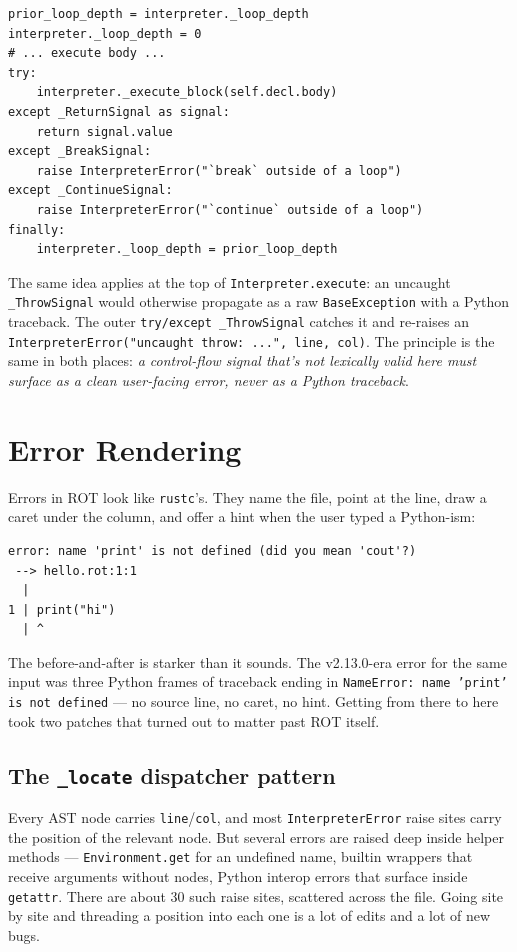 \documentclass[11pt]{article}
\begin{document}
\begin{lstlisting}[style=pystyle]
prior_loop_depth = interpreter._loop_depth
interpreter._loop_depth = 0
# ... execute body ...
try:
    interpreter._execute_block(self.decl.body)
except _ReturnSignal as signal:
    return signal.value
except _BreakSignal:
    raise InterpreterError("`break` outside of a loop")
except _ContinueSignal:
    raise InterpreterError("`continue` outside of a loop")
finally:
    interpreter._loop_depth = prior_loop_depth
\end{lstlisting}

The same idea applies at the top of \texttt{Interpreter.execute}: an uncaught \texttt{\_ThrowSignal} would otherwise propagate as a raw \texttt{BaseException} with a Python traceback. The outer \texttt{try/except \_ThrowSignal} catches it and re-raises an \texttt{InterpreterError("uncaught throw: ...", line, col)}. The principle is the same in both places: \emph{a control-flow signal that's not lexically valid here must surface as a clean user-facing error, never as a Python traceback}.

\section{Error Rendering}

Errors in ROT look like \texttt{rustc}'s. They name the file, point at the line, draw a caret under the column, and offer a hint when the user typed a Python-ism:

\begin{lstlisting}[style=plainstyle, basicstyle=\ttfamily\footnotesize]
error: name 'print' is not defined (did you mean 'cout'?)
 --> hello.rot:1:1
  |
1 | print("hi")
  | ^
\end{lstlisting}

The before-and-after is starker than it sounds. The v2.13.0-era error for the same input was three Python frames of traceback ending in \texttt{NameError: name 'print' is not defined} --- no source line, no caret, no hint. Getting from there to here took two patches that turned out to matter past ROT itself.

\subsection{The \texttt{\_locate} dispatcher pattern}

Every AST node carries \texttt{line}/\texttt{col}, and most \texttt{InterpreterError} raise sites carry the position of the relevant node. But several errors are raised deep inside helper methods --- \texttt{Environment.get} for an undefined name, builtin wrappers that receive arguments without nodes, Python interop errors that surface inside \texttt{getattr}. There are about 30 such raise sites, scattered across the file. Going site by site and threading a position into each one is a lot of edits and a lot of new bugs.
\end{document}
